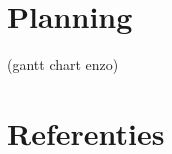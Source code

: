 \documentclass[a4paper,twoside,kulak]{kulakreport}
\begin{document}
\chapter{Planning}
(gantt chart enzo\texttt{})

\chapter*{Referenties}


\end{document}
